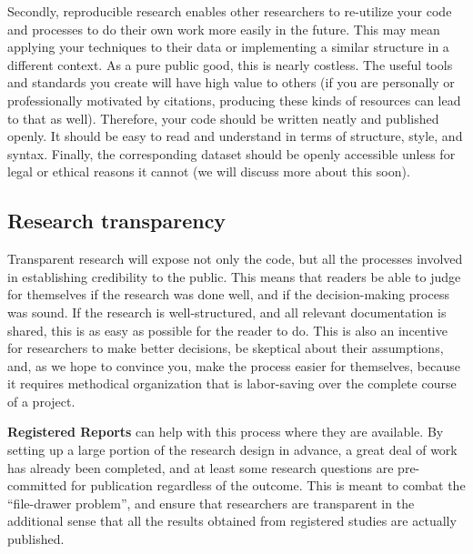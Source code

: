 Secondly, reproducible research
enables other researchers to re-utilize your code and processes
to do their own work more easily in the future.
This may mean applying your techniques to their data
or implementing a similar structure in a different context.
As a pure public good, this is nearly costless.
The useful tools and standards you create will have high value to others 
(if you are personally or professionally motivated by citations,
producing these kinds of resources can lead to that as well).
Therefore, your code should be written neatly and published openly.
It should be easy to read and understand in terms of structure, style, and syntax.
Finally, the corresponding dataset should be openly accessible
unless for legal or ethical reasons it cannot (we will discuss more about this soon).

\subsection{Research transparency}

Transparent research will expose not only the code, but all the processes involved in establishing credibility to the public.
This means that readers be able to judge for themselves if the research was done well,
and if the decision-making process was sound.
If the research is well-structured, and all relevant documentation is shared,
this is as easy as possible for the reader to do.
This is also an incentive for researchers to make better decisions,
be skeptical about their assumptions,
and, as we hope to convince you, make the process easier for themselves,
because it requires methodical organization that is labor-saving over the complete course of a project.

\textbf{Registered Reports} can help with this process where they are available.
By setting up a large portion of the research design in advance,
a great deal of work has already been completed,
and at least some research questions are pre-committed for publication regardless of the outcome.
This is meant to combat the ``file-drawer problem'',\cite{simonsohn2014p}
and ensure that researchers are transparent in the additional sense that
all the results obtained from registered studies are actually published.

